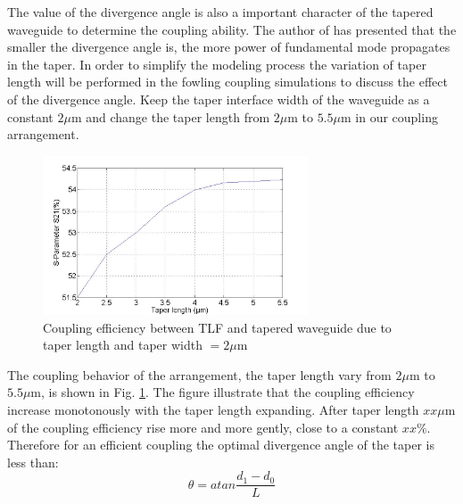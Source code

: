The value of the divergence angle is also a important character of the tapered waveguide to determine the coupling ability. The author of \cite{study_linear_tapered_waveguides} has presented that the smaller the divergence angle is, the more power of fundamental mode propagates in the taper. In order to simplify the modeling process the variation of taper length will be performed in the fowling coupling simulations to discuss the effect of the divergence angle.
Keep the taper interface width of the waveguide as a constant $2\mu$m and change the taper length from $2\mu$m to $5.5\mu$m in our coupling arrangement.  

\begin{figure}[!ht]
\centering
\includegraphics[width=0.7\textwidth]{bilder/tapered_waveguide_dxx}
\caption{Coupling efficiency between TLF and tapered waveguide due to taper length and taper width $= 2\mu$m}
\label{fig:tapered_waveguide_dxx}
\end{figure}
The coupling behavior of the arrangement, the taper length vary from $2\mu$m to $5.5\mu$m, is shown in Fig. \ref{fig:tapered_waveguide_dxx}.  The figure illustrate that the coupling efficiency increase monotonously with the taper length expanding. After taper length $xx\mu$m of the coupling efficiency rise more and more gently, close to a constant $xx\%$. 
Therefore for an efficient coupling the optimal divergence angle of the taper is less than:
\begin{equation}
\theta=atan\frac{d_{1}-d_{0}}{L}
\label{eq:divergence_angle}
\end{equation}
